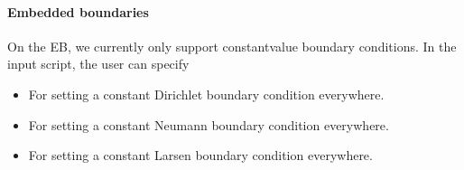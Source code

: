 \documentclass[letterpaper,10pt,english]{sphinxmanual}
\begin{document}
\paragraph{Embedded boundaries}
\label{\detokenize{Solvers/RTE:embedded-boundaries}}
\sphinxAtStartPar
On the EB, we currently only support constant\sphinxhyphen{}value boundary conditions.
In the input script, the user can specify
\begin{itemize}
\item {} 
\sphinxAtStartPar
{} For setting a constant Dirichlet boundary condition everywhere.

\item {} 
\sphinxAtStartPar
{} For setting a constant Neumann boundary condition everywhere.

\item {} 
\sphinxAtStartPar
{} For setting a constant Larsen boundary condition everywhere.

\end{itemize}
\end{document}
